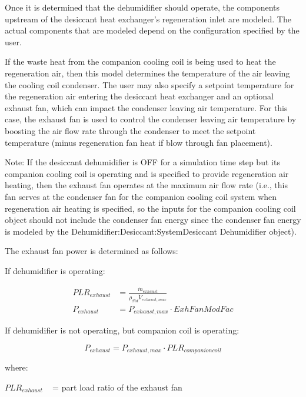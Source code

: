Once it is determined that the dehumidifier should operate, the components upstream of the desiccant heat exchanger's regeneration inlet are modeled. The actual components that are modeled depend on the configuration specified by the user.

If the waste heat from the companion cooling coil is being used to heat the regeneration air, then this model determines the temperature of the air leaving the cooling coil condenser. The user may also specify a setpoint temperature for the regeneration air entering the desiccant heat exchanger and an optional exhaust fan, which can impact the condenser leaving air temperature. For this case, the exhaust fan is used to control the condenser leaving air temperature by boosting the air flow rate through the condenser to meet the setpoint temperature (minus regeneration fan heat if blow through fan placement).

Note: If the desiccant dehumidifier is OFF for a simulation time step but its companion cooling coil is operating and is specified to provide regeneration air heating, then the exhaust fan operates at the maximum air flow rate (i.e., this fan serves at the condenser fan for the companion cooling coil system when regeneration air heating is specified, so the inputs for the companion cooling coil object should not include the condenser fan energy since the condenser fan energy is modeled by the Dehumidifier:Desiccant:SystemDesiccant Dehumidifier object).

The exhaust fan power is determined as follows:

If dehumidifier is operating:

\begin{equation}
  \begin{array}{rl}
    PLR_{exhaust} &= \frac{\dot{m}_{exhaust}}{\rho_{Std}\dot{V}_{exhaust,max}} \\
    P_{exhaust} &= P_{exhaust,max} \cdot ExhFanModFac
  \end{array}
\end{equation}

If dehumidifier is not operating, but companion coil is operating:

\begin{equation}
  P_{exhaust} = P_{exhaust,max} \cdot PLR_{companion coil}
\end{equation}

where:

\(PL{R_{exhaust}}\) ~ = part load ratio of the exhaust fan

